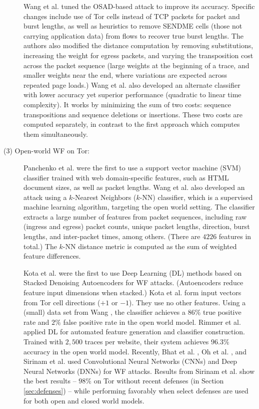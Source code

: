 \documentclass[runningheads]{llncs}
\begin{document}
\begin{description}
Wang et al. \cite{wang2013improved} tuned the OSAD-based attack to improve its accuracy. Specific changes
include use of Tor cells instead of TCP packets for packet and burst lengths, as well as heuristics
to remove SENDME cells (those not carrying application data) from flows to recover true
burst lengths. The authors also modified the distance computation by removing substitutions,
increasing the weight for egress packets, and varying the transposition cost across the packet
sequence (large weights at the beginning of a trace, and smaller weights near the end, where
variations are expected across repeated page loads.) Wang et al. also developed an alternate classifier
with lower accuracy yet superior performance (quadratic to linear time complexity). It works by
minimizing the sum of two costs: sequence transpositions and sequence deletions or insertions. These
two costs are computed separately, in contrast to the first approach which computes them simultaneously.

\item [(3) Open-world WF on Tor:] Panchenko et al. \cite{panchenko2011website}
were the first to use a support vector machine (SVM) classifier trained with web domain-specific
features, such as HTML document sizes, as well as packet lengths.
Wang et al. \cite{wang2014effective} also developed an attack using a $k$-Nearest Neighbors ($k$-NN) classifier,
which is a supervised machine learning algorithm, targeting the open world setting. The classifier
extracts a large number of features from packet sequences, including raw (ingress and egress)
packet counts, unique packet lengths, direction, burst lengths, and inter-packet times, among others.
(There are $4226$ features in total.) The $k$-NN distance metric is computed as the sum of weighted
feature differences.

Kota et al. \cite{abe2016fingerprinting} were the first to use Deep Learning (DL) methods based on Stacked
Denoising Autoencoders for WF attacks. (Autoencoders reduce feature input dimensions when stacked.)
Kota et al. form input vectors from Tor cell directions ($+1$ or $-1$). They use no other features.
Using a (small) data set from Wang \cite{wang2016website}, the classifier achieves a $86\%$ true positive
rate and $2\%$ false positive rate in the open world model. Rimmer et al. \cite{rimmer2018automated}
applied DL for automated feature generation and classifier construction. Trained with $2,500$ traces per
website, their system achieves $96.3\%$ accuracy in the open world model.
Recently, Bhat et al. \cite{bhat2018var}, Oh et al. \cite{oh2017pfp}, and Sirinam et al. \cite{sirinam2018deep}
used Convolutional Neural Networks (CNNs) and Deep Neural Networks (DNNs) for WF attacks. Results from
Sirinam et al. show the best results -- $98\%$ on Tor without recent defenses (in Section \ref{sec:defenses}) --
while performing favorably when select defenses are used for both open and closed world models.

\end{description}
\end{document}
